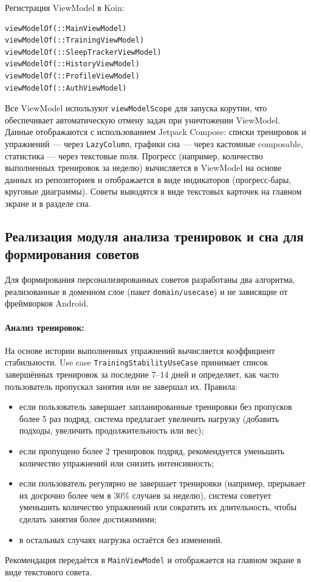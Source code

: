 Регистрация ViewModel в Koin:
\begin{verbatim}
viewModelOf(::MainViewModel)
viewModelOf(::TrainingViewModel)
viewModelOf(::SleepTrackerViewModel)
viewModelOf(::HistoryViewModel)
viewModelOf(::ProfileViewModel)
viewModelOf(::AuthViewModel)
\end{verbatim}

Все ViewModel используют \texttt{viewModelScope} для запуска корутин, что обеспечивает автоматическую отмену задач при уничтожении ViewModel. Данные отображаются с использованием Jetpack Compose: списки тренировок и упражнений — через \texttt{LazyColumn}, графики сна — через кастомные composable, статистика — через текстовые поля. Прогресс (например, количество выполненных тренировок за неделю) вычисляется в ViewModel на основе данных из репозиториев и отображается в виде индикаторов (прогресс-бары, круговые диаграммы). Советы выводятся в виде текстовых карточек на главном экране и в разделе сна.

\subsection{Реализация модуля анализа тренировок и сна для формирования советов}

Для формирования персонализированных советов разработаны два алгоритма, реализованные в доменном слое (пакет \texttt{domain/usecase}) и не зависящие от фреймворков Android.

\paragraph{Анализ тренировок:} 
На основе истории выполненных упражнений вычисляется коэффициент стабильности. Use case \texttt{TrainingStabilityUseCase} принимает список завершённых тренировок за последние 7–14 дней и определяет, как часто пользователь пропускал занятия или не завершал их. Правила:
\begin{itemize}
    \item если пользователь завершает запланированные тренировки без пропусков более 5 раз подряд, система предлагает увеличить нагрузку (добавить подходы, увеличить продолжительность или вес);
    \item если пропущено более 2 тренировок подряд, рекомендуется уменьшить количество упражнений или снизить интенсивность;
    \item если пользователь регулярно не завершает тренировки (например, прерывает их досрочно более чем в 30\% случаев за неделю), система советует уменьшить количество упражнений или сократить их длительность, чтобы сделать занятия более достижимими;
    \item в остальных случаях нагрузка остаётся без изменений.
\end{itemize}
Рекомендация передаётся в \texttt{MainViewModel} и отображается на главном экране в виде текстового совета.

